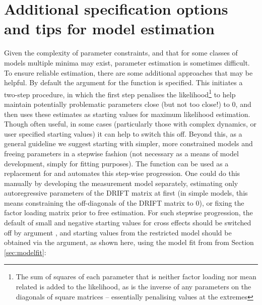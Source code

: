 \documentclass[nojss]{jss}\usepackage[]{graphicx}\usepackage[]{color}
\begin{document}
\section[Tips]{Additional specification options and tips for model estimation} \label{sec:tips}\nopagebreak
Given the complexity of parameter constraints, and that for some classes of models multiple minima may exist, parameter estimation is sometimes difficult. To ensure reliable estimation, there are some additional approaches that may be helpful. By default the argument  for the  function is specified. This initiates a two-step procedure, in which the first step penalises the likelihood\footnote{The sum of squares of each parameter that is neither factor loading nor mean related is added to the likelihood, as is the inverse of any parameters on the diagonals of square matrices -- essentially penalising values at the extremes} to help maintain potentially problematic parameters close (but not too close!) to 0, and then uses these estimates as starting values for maximum likelihood estimation. Though often useful, in some cases (particularly those with complex dynamics, or user specified starting values) it can help to switch this off. Beyond this, as a general guideline we suggest starting with simpler, more constrained models and freeing parameters in a stepwise fashion (not necessary as a means of model development, simply for fitting purposes). The  function can be used as a replacement for  and automates this step-wise progression. One could do this manually by developing the measurement model separately, estimating only autoregressive parameters of the DRIFT matrix at first (in simple models, this means constraining the off-diagonals of the DRIFT matrix to 0), or fixing the factor loading matrix prior to free estimation. For such stepwise progression, the default of small and negative starting values for cross effects should be switched off by argument , and starting values from the restricted model should be obtained via the  argument, as shown here, using the model fit from from Section \ref{sec:modelfit}:

\begin{Schunk}
\end{Schunk}
\end{document}
